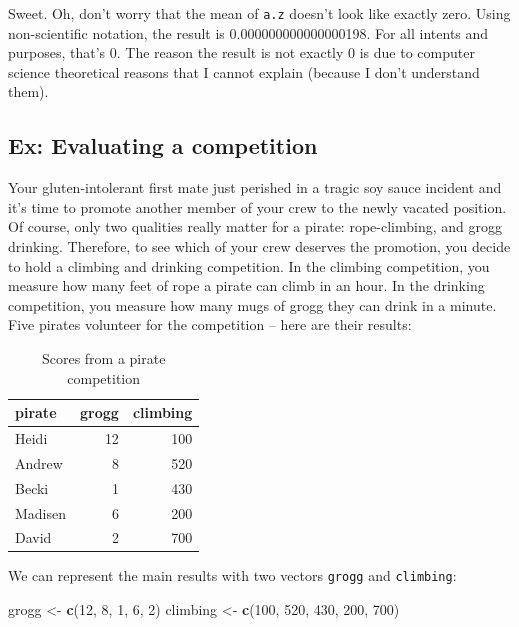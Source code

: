 \documentclass[]{book}
\newenvironment{Shaded}{\begin{snugshade}}{\end{snugshade}}
\newcommand{\KeywordTok}[1]{\textcolor[rgb]{0.13,0.29,0.53}{\textbf{{#1}}}}
\newcommand{\DecValTok}[1]{\textcolor[rgb]{0.00,0.00,0.81}{{#1}}}
\newcommand{\StringTok}[1]{\textcolor[rgb]{0.31,0.60,0.02}{{#1}}}
\newcommand{\NormalTok}[1]{{#1}}
\theoremstyle{definition}
\theoremstyle{definition}
\theoremstyle{remark}
\begin{document}
Sweet. Oh, don't worry that the mean of \texttt{a.z} doesn't look like
exactly zero. Using non-scientific notation, the result is
0.000000000000000198. For all intents and purposes, that's 0. The reason
the result is not exactly 0 is due to computer science theoretical
reasons that I cannot explain (because I don't understand them).

\subsection{Ex: Evaluating a
competition}\label{ex-evaluating-a-competition}

Your gluten-intolerant first mate just perished in a tragic soy sauce
incident and it's time to promote another member of your crew to the
newly vacated position. Of course, only two qualities really matter for
a pirate: rope-climbing, and grogg drinking. Therefore, to see which of
your crew deserves the promotion, you decide to hold a climbing and
drinking competition. In the climbing competition, you measure how many
feet of rope a pirate can climb in an hour. In the drinking competition,
you measure how many mugs of grogg they can drink in a minute. Five
pirates volunteer for the competition -- here are their results:

\begin{table}

\caption{\label{tab:unnamed-chunk-120}Scores from a pirate competition}
\centering
\begin{tabular}[t]{l|r|r}
\hline
pirate & grogg & climbing\\
\hline
Heidi & 12 & 100\\
\hline
Andrew & 8 & 520\\
\hline
Becki & 1 & 430\\
\hline
Madisen & 6 & 200\\
\hline
David & 2 & 700\\
\hline
\end{tabular}
\end{table}

We can represent the main results with two vectors \texttt{grogg} and
\texttt{climbing}:

\begin{Shaded}
\begin{Highlighting}[]
\NormalTok{grogg <-}\StringTok{ }\KeywordTok{c}\NormalTok{(}\DecValTok{12}\NormalTok{, }\DecValTok{8}\NormalTok{, }\DecValTok{1}\NormalTok{, }\DecValTok{6}\NormalTok{, }\DecValTok{2}\NormalTok{)}
\NormalTok{climbing <-}\StringTok{ }\KeywordTok{c}\NormalTok{(}\DecValTok{100}\NormalTok{, }\DecValTok{520}\NormalTok{, }\DecValTok{430}\NormalTok{, }\DecValTok{200}\NormalTok{, }\DecValTok{700}\NormalTok{)}
\end{Highlighting}
\end{Shaded}
\end{document}
